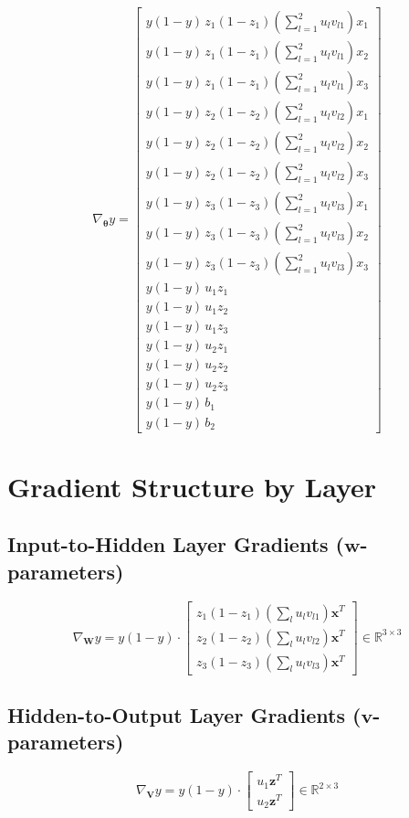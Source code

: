 \documentclass{tufte-handout}
\begin{document}
\[
\nabla_{\bm{\theta}} y = 
\begin{bmatrix}
y(1-y) \, z_1(1-z_1) \left(\sum_{l=1}^2 u_l v_{l1}\right) x_1 \\
y(1-y) \, z_1(1-z_1) \left(\sum_{l=1}^2 u_l v_{l1}\right) x_2 \\
y(1-y) \, z_1(1-z_1) \left(\sum_{l=1}^2 u_l v_{l1}\right) x_3 \\[0.5em]
y(1-y) \, z_2(1-z_2) \left(\sum_{l=1}^2 u_l v_{l2}\right) x_1 \\
y(1-y) \, z_2(1-z_2) \left(\sum_{l=1}^2 u_l v_{l2}\right) x_2 \\
y(1-y) \, z_2(1-z_2) \left(\sum_{l=1}^2 u_l v_{l2}\right) x_3 \\[0.5em]
y(1-y) \, z_3(1-z_3) \left(\sum_{l=1}^2 u_l v_{l3}\right) x_1 \\
y(1-y) \, z_3(1-z_3) \left(\sum_{l=1}^2 u_l v_{l3}\right) x_2 \\
y(1-y) \, z_3(1-z_3) \left(\sum_{l=1}^2 u_l v_{l3}\right) x_3 \\[0.5em]
y(1-y) \, u_1 z_1 \\
y(1-y) \, u_1 z_2 \\
y(1-y) \, u_1 z_3 \\[0.5em]
y(1-y) \, u_2 z_1 \\
y(1-y) \, u_2 z_2 \\
y(1-y) \, u_2 z_3 \\[0.5em]
y(1-y) \, b_1 \\
y(1-y) \, b_2
\end{bmatrix}
\]

\section*{Gradient Structure by Layer}

\subsection*{Input-to-Hidden Layer Gradients ($\bm{w}$-parameters)}
\[
\nabla_{\bm{W}} y = y(1-y) \cdot 
\begin{bmatrix}
z_1(1-z_1)\left(\sum_{l} u_l v_{l1}\right) \bm{x}^T \\
z_2(1-z_2)\left(\sum_{l} u_l v_{l2}\right) \bm{x}^T \\
z_3(1-z_3)\left(\sum_{l} u_l v_{l3}\right) \bm{x}^T
\end{bmatrix}
\in \mathbb{R}^{3 \times 3}
\]

\subsection*{Hidden-to-Output Layer Gradients ($\bm{v}$-parameters)}
\[
\nabla_{\bm{V}} y = y(1-y) \cdot 
\begin{bmatrix}
u_1 \bm{z}^T \\
u_2 \bm{z}^T
\end{bmatrix}
\in \mathbb{R}^{2 \times 3}
\]
\end{document}
